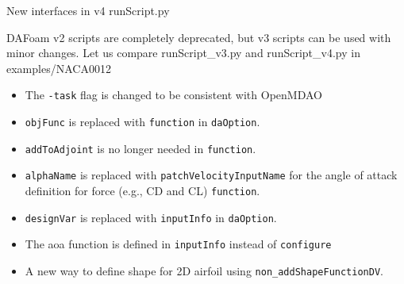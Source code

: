 \documentclass{bredelebeamer}
\begin{document}
\begin{frame}{New interfaces in v4 runScript.py}

DAFoam v2 scripts are completely deprecated, but v3 scripts can be used with minor changes. Let us compare runScript\_v3.py and runScript\_v4.py in examples/NACA0012

\begin{itemize}

  \item The \texttt{-task} flag is changed to be consistent with OpenMDAO
  \item \texttt{objFunc} is replaced with \texttt{function} in \texttt{daOption}.
  \item \texttt{addToAdjoint} is no longer needed in \texttt{function}.
  \item \texttt{alphaName} is replaced with \texttt{patchVelocityInputName} for the angle of attack definition for force (e.g., CD and CL) \texttt{function}.
  \item \texttt{designVar} is replaced with \texttt{inputInfo} in \texttt{daOption}.
  \item The aoa function is defined in \texttt{inputInfo} instead of \texttt{configure}
  \item A new way to define shape for 2D airfoil using \texttt{non\_addShapeFunctionDV}.
\end{itemize}

\end{frame}
\end{document}
